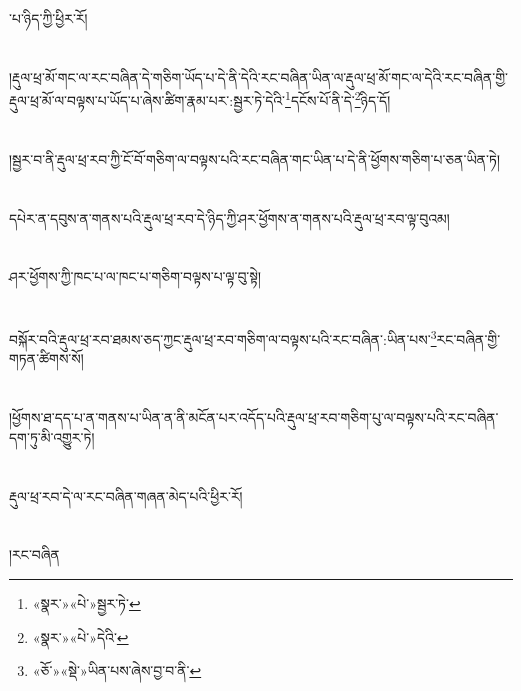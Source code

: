 ་པ་ཉིད་ཀྱི་ཕྱིར་རོ།\chapter{ }།རྡུལ་ཕྲ་མོ་གང་ལ་རང་བཞིན་དེ་གཅིག་ཡོད་པ་དེ་ནི་དེའི་རང་བཞིན་ཡིན་ལ་རྡུལ་ཕྲ་མོ་གང་ལ་དེའི་རང་བཞིན་གྱི་རྡུལ་ཕྲ་མོ་ལ་བལྟས་པ་ཡོད་པ་ཞེས་ཚིག་རྣམ་པར་:སྦྱར་ཏེ་དེའི་\footnote{«སྣར་»«པེ་»སྦྱར་ཏེ་}དངོས་པོ་ནི་དེ་\footnote{«སྣར་»«པེ་»དེའི་}ཉིད་དོ།\chapter{ }།སྦྱར་བ་ནི་རྡུལ་ཕྲ་རབ་ཀྱི་ངོ་བོ་གཅིག་ལ་བལྟས་པའི་རང་བཞིན་གང་ཡིན་པ་དེ་ནི་ཕྱོགས་གཅིག་པ་ཅན་ཡིན་ཏེ།\chapter{ }དཔེར་ན་དབུས་ན་གནས་པའི་རྡུལ་ཕྲ་རབ་དེ་ཉིད་ཀྱི་ཤར་ཕྱོགས་ན་གནས་པའི་རྡུལ་ཕྲ་རབ་ལྟ་བུའམ།\chapter{ }ཤར་ཕྱོགས་ཀྱི་ཁང་པ་ལ་ཁང་པ་གཅིག་བལྟས་པ་ལྟ་བུ་སྟེ།\chapter{ }བསྐོར་བའི་རྡུལ་ཕྲ་རབ་ཐམས་ཅད་ཀྱང་རྡུལ་ཕྲ་རབ་གཅིག་ལ་བལྟས་པའི་རང་བཞིན་:ཡིན་པས་\footnote{«ཅོ་»«སྡེ་»ཡིན་པས་ཞེས་བྱ་བ་ནི་}རང་བཞིན་གྱི་གཏན་ཚིགས་སོ།\chapter{ }།ཕྱོགས་ཐ་དད་པ་ན་གནས་པ་ཡིན་ན་ནི་མངོན་པར་འདོད་པའི་རྡུལ་ཕྲ་རབ་གཅིག་པུ་ལ་བལྟས་པའི་རང་བཞིན་དག་ཏུ་མི་འགྱུར་ཏེ།\chapter{ }རྡུལ་ཕྲ་རབ་དེ་ལ་རང་བཞིན་གཞན་མེད་པའི་ཕྱིར་རོ།\chapter{ }།རང་བཞིན